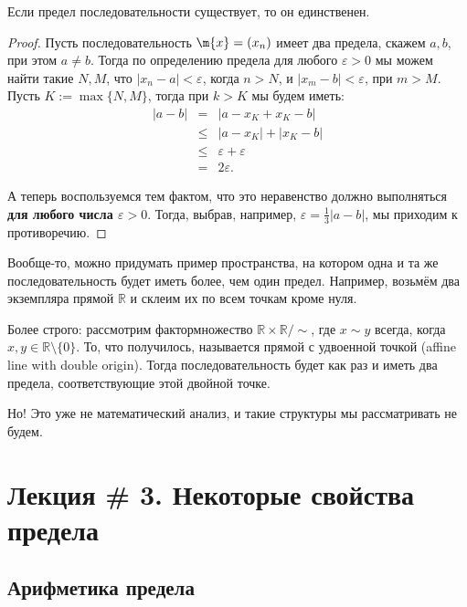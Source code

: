 \begin{theorem}
    Если предел последовательности существует, то он единственен.
\end{theorem}
\begin{proof}
    Пусть последовательность $\m{x} = (x_n)$ имеет два предела, скажем $a,b$, при этом $a\ne b$. Тогда по определению предела для любого $\varepsilon>0$ мы можем найти такие $N, M$, что $|x_n - a|<\varepsilon$, когда $n>N$, и $|x_m-b|<\varepsilon$, при $m>M$. Пусть $K:=\max\{N,M\}$, тогда при $k>K$ мы будем иметь:
   \begin{eqnarray*}
      |a-b| &=& |a-x_K + x_K -b| \\
      &\le & |a-x_K| + |x_K-b| \\
      &\le& \varepsilon + \varepsilon \\
      &=& 2 \varepsilon.
   \end{eqnarray*}

    А теперь воспользуемся тем фактом, что это неравенство должно выполняться \textbf{для любого числа $\varepsilon>0$}. Тогда, выбрав, например, $\varepsilon = \frac{1}{3}|a-b|$, мы приходим к противоречию.
\end{proof}

\begin{remark}
Вообще-то, можно придумать пример пространства, на котором одна и та же последовательность будет иметь более, чем один предел. Например, возьмём два экземпляра прямой $\mathbb{R}$ и склеим их по всем точкам кроме нуля.

Более строго: рассмотрим фактормножество $\mathbb{R}\times \mathbb{R}/\sim$, где $x \sim y$ всегда, когда $x,y \in \mathbb{R}\setminus \{0\}$. То, что получилось, называется прямой с удвоенной точкой (affine line with double origin). Тогда последовательность будет как раз и иметь два предела, соответствующие этой двойной точке.

Но! Это уже не математический анализ, и такие структуры мы рассматривать не будем.
\end{remark}


\section{Лекция \# 3. Некоторые свойства предела}

\subsection{Арифметика предела}


